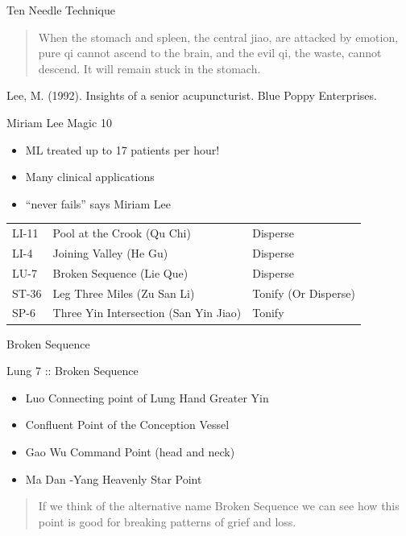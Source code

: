 \begin{frame}{Ten Needle Technique}
\begin{quote}     
When the stomach and spleen, the central jiao, are attacked by
emotion, pure qi cannot ascend to the brain, and the evil qi, the
waste, cannot descend. It will remain stuck in the stomach.
\end{quote}

Lee, M. (1992). Insights of a senior acupuncturist. Blue Poppy
Enterprises.

\end{frame}

\begin{frame}{Miriam Lee Magic 10}
\begin{itemize}
\item ML treated up to 17 patients per hour!
\item Many clinical applications
\item ``never fails'' says Miriam Lee
\end{itemize}

\begin{table}[]
\begin{tabular}{@{}lll@{}}
\toprule
LI-11 & Pool at the Crook (Qu Chi)            & Disperse             \\
LI-4  & Joining Valley (He Gu)                & Disperse             \\
LU-7  & Broken Sequence (Lie Que)             & Disperse             \\
ST-36 & Leg Three Miles (Zu San Li)           & Tonify (Or Disperse) \\
SP-6  & Three Yin Intersection (San Yin Jiao) & Tonify               \\ \bottomrule
\end{tabular}
\end{table}

\end{frame}

\begin{frame}{Broken Sequence}

\large{Lung 7 :: Broken Sequence}

\begin{itemize}
\item Luo Connecting point of Lung Hand Greater Yin
\item Confluent Point of the Conception Vessel
\item Gao Wu Command Point (head and neck)
\item Ma Dan -Yang Heavenly Star Point
\end{itemize}

\vspace{1em}

\begin{quote}
If we think of the alternative name Broken Sequence we can see how this point is good for breaking patterns of grief and loss.
\end{quote}

\end{frame}

